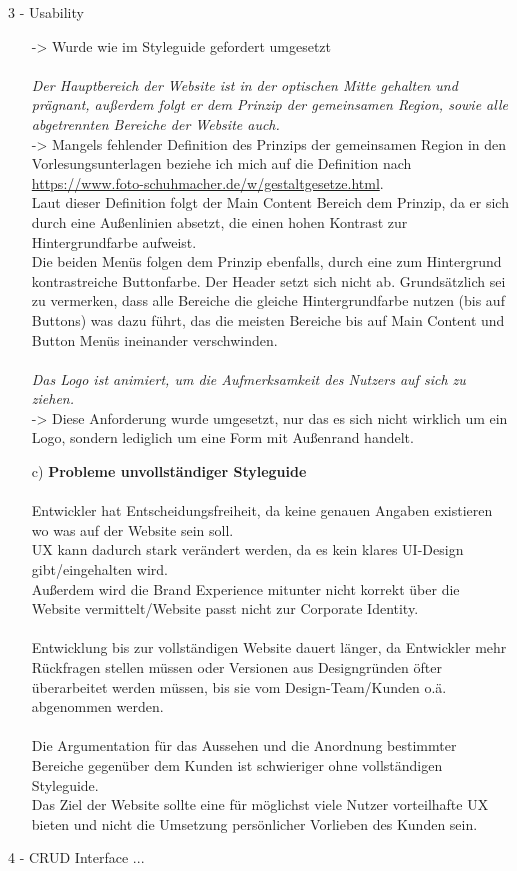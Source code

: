\documentclass[a4paper]{article}
\begin{document}
\begin{exercise}{3 - Usability}
\begin{itemize}
-> Wurde wie im Styleguide gefordert umgesetzt\\\\
\textit{Der Hauptbereich der Website ist in der optischen Mitte gehalten und prägnant, außerdem folgt er dem Prinzip der gemeinsamen Region, sowie alle abgetrennten Bereiche der Website auch. }\\
-> Mangels fehlender Definition des Prinzips der gemeinsamen Region in den Vorlesungsunterlagen beziehe ich mich auf die Definition nach \url{https://www.foto-schuhmacher.de/w/gestaltgesetze.html}.\\ Laut dieser Definition folgt der Main Content Bereich dem Prinzip, da er sich durch eine Außenlinien absetzt, die einen hohen Kontrast zur Hintergrundfarbe aufweist.\\
Die beiden Menüs folgen dem Prinzip ebenfalls, durch eine zum Hintergrund kontrastreiche Buttonfarbe. Der Header setzt sich nicht ab. Grundsätzlich sei zu vermerken, dass alle Bereiche die gleiche Hintergrundfarbe nutzen (bis auf Buttons) was dazu führt, das die meisten Bereiche bis auf Main Content und Button Menüs ineinander verschwinden.\\\\
\textit{Das Logo ist animiert, um die Aufmerksamkeit des Nutzers auf sich zu ziehen. }\\
-> Diese Anforderung wurde umgesetzt, nur das es sich nicht wirklich um ein Logo, sondern lediglich um eine Form mit Außenrand handelt.

\item[c)]\textbf{Probleme unvollständiger Styleguide}\\\\
Entwickler hat Entscheidungsfreiheit, da keine genauen Angaben existieren wo was auf der Website sein soll.\\
UX kann dadurch stark verändert werden, da es kein klares UI-Design gibt/eingehalten wird. \\
Außerdem wird die Brand Experience mitunter nicht korrekt über die Website vermittelt/Website passt nicht zur Corporate Identity.\\\\
Entwicklung bis zur vollständigen Website dauert länger, da Entwickler mehr Rückfragen stellen müssen oder Versionen aus Designgründen öfter überarbeitet werden müssen, bis sie vom Design-Team/Kunden o.ä. abgenommen werden.\\\\
Die Argumentation für das Aussehen und die Anordnung bestimmter Bereiche gegenüber dem Kunden ist schwieriger ohne vollständigen Styleguide.\\
Das Ziel der Website sollte eine für möglichst viele Nutzer vorteilhafte UX bieten und nicht die Umsetzung persönlicher Vorlieben des Kunden sein.
\end{itemize}
\end{exercise}

\begin{exercise}{4 - CRUD Interface} 
...
\end{exercise}
\end{document}
